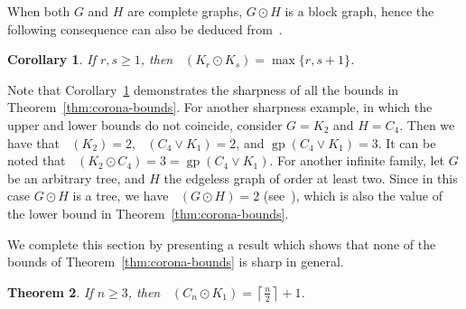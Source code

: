 \documentclass[a4paper,12pt]{article}
\DeclareMathOperator{\mob}{Mob_{gp}}
\DeclareMathOperator{\gp}{gp}
\newtheorem{theorem}{Theorem}[section]
\newtheorem{corollary}[theorem]{Corollary}
\theoremstyle{definition}
\begin{document}
	When both $G$ and $H$ are complete graphs, $G\odot H$ is a block graph, hence the following consequence can also be deduced from~\cite[Theorem~2.3]{klavzar-2023}.  
	
	\begin{corollary}
		\label{cor:complete-complete}
		If $r,s \ge 1$, then
		$\mob(K_r\odot K_s) = \max\{r,s+1\}$.
	\end{corollary}
	
	Note that Corollary~\ref{cor:complete-complete} demonstrates the sharpness of all the bounds in Theorem~\ref{thm:corona-bounds}. For another sharpness example, in which the upper and lower bounds do not coincide, consider $G = K_2$ and $H = C_4$. Then we have that $\mob(K_2)=2$, $\mob(C_4\vee K_1)=2$, and $\gp(C_4\vee K_1)=3$. It can be noted that $\mob(K_2\odot C_4) = 3 = \gp (C_4 \vee K_1)$. For another infinite family, let $G$ be an arbitrary tree, and $H$ the edgeless graph of order at least two. Since in this case $G\odot H$ is a tree, we have $\mob(G\odot H) = 2$ (see~\cite[Theorem 2.3]{klavzar-2023}), which is also the value of the lower bound in Theorem~\ref{thm:corona-bounds}. 
	
	We complete this section by presenting a result which shows that none of the bounds of Theorem~\ref{thm:corona-bounds} is sharp in general. 
	
	\begin{theorem}
		\label{thm:corona-cycle-K_1}    
		If $n\ge 3$, then $\mob(C_n \odot K_1) = \left\lceil \frac{n}{2}\right\rceil + 1$. 
	\end{theorem}
	
\end{document}
